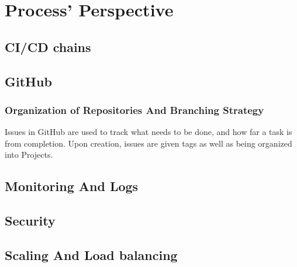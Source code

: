 \section{Process' Perspective}
\label{sec:process_perspective}



\subsection{CI/CD chains}

\subsection{GitHub}

\subsubsection{Organization of Repositories And Branching Strategy}
Issues in GitHub are used to track what needs to be done, and how far a task is from completion. Upon creation, issues are given tags as well as being organized into Projects.




\subsection{Monitoring And Logs}

\subsection{Security}


\subsection{Scaling And Load balancing}





